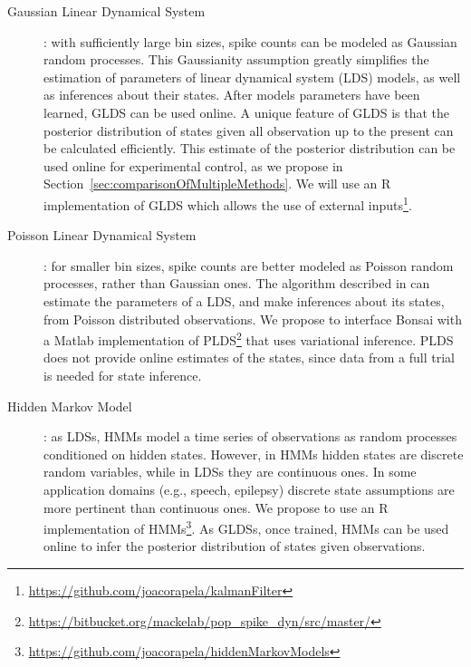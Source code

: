 \documentclass[a4paper,11point]{article}
\begin{document}
\begin{description}

    \item[Gaussian Linear Dynamical
        System]\citep[GLDS;][]{andersonAndMoore12}: with sufficiently large
        bin sizes, spike counts can be modeled as Gaussian random processes.
        This Gaussianity assumption greatly simplifies the estimation of
        parameters of linear dynamical system (LDS) models, as well as
        inferences about their states. After models parameters have been
        learned, GLDS can be used online. A unique feature of GLDS is that the
        posterior distribution of states given all observation up to the
        present can be calculated efficiently. This estimate of the posterior
        distribution can be used online for experimental control, as we
        propose in Section~\ref{sec:comparisonOfMultipleMethods}. We will use an R implementation of GLDS
        which allows the use of external
        inputs\footnote{\href{https://github.com/joacorapela/kalmanFilter}{https://github.com/joacorapela/kalmanFilter}}.

    \item[Poisson Linear Dynamical System]\citep[PLDS;][]{mackeEtAl15}: for
        smaller bin sizes, spike counts are better modeled as Poisson random
        processes, rather than Gaussian ones. The algorithm described in
        \citet{mackeEtAl15} can estimate the parameters of a LDS, and make
        inferences about its states, from Poisson distributed observations.  We
        propose to interface Bonsai with a Matlab implementation of
        PLDS\footnote{\href{https://bitbucket.org/mackelab/pop\_spike\_dyn/src/master/}{https://bitbucket.org/mackelab/pop\_spike\_dyn/src/master/}}
        that uses variational inference. PLDS does not provide online estimates
        of the states, since data from a full trial is needed for state
        inference.

    \item[Hidden Markov Model]\citep[HMM;][]{rabiner89}: as LDSs, HMMs model a
        time series of observations as random processes conditioned on hidden
        states. However, in HMMs hidden states are discrete random variables,
        while in LDSs they are continuous ones. In some application domains
        (e.g., speech, epilepsy) discrete state assumptions are more pertinent
        than continuous ones. We propose to use an R implementation of
        HMMs\footnote{\href{https://github.com/joacorapela/hiddenMarkovModels}{https://github.com/joacorapela/hiddenMarkovModels}}.
        As GLDSs, once trained, HMMs can be used online to infer the posterior
        distribution of states given observations.


\end{description}
\end{document}

